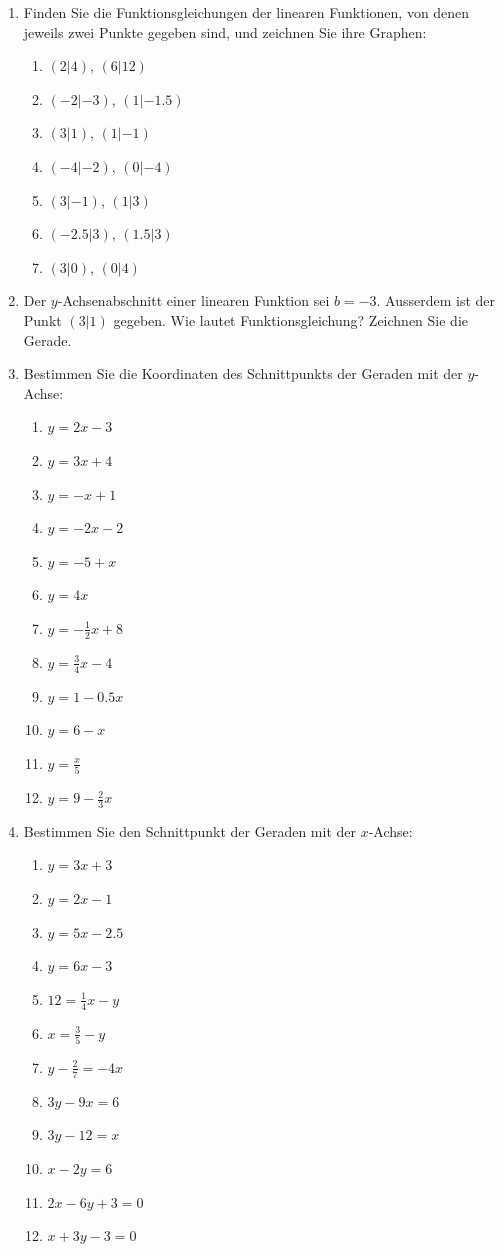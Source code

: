 \documentclass[%
11pt,%
twoside,%
titlepage,%
german,%
headsepline%
]{scrartcl}
\begin{document}
{{{\begin{enumerate}
\item Finden Sie die Funktionsgleichungen der linearen Funktionen, von denen jeweils zwei Punkte gegeben sind, und zeichnen Sie ihre Graphen:
  \begin{enumerate}
  \item $(2|4)$, $(6|12)$
  \item $(-2|-3)$, $(1|-1.5)$
  \item $(3|1)$, $(1|-1)$
  \item $(-4|-2)$, $(0|-4)$
  \item $(3|-1)$, $(1|3)$
  \item $(-2.5|3)$, $(1.5|3)$
  \item $(3|0)$, $(0|4)$
  \end{enumerate}

\item Der $y$-Achsenabschnitt einer linearen Funktion sei $b=-3$. Ausserdem ist der Punkt $(3|1)$ gegeben. Wie lautet Funktionsgleichung? Zeichnen Sie die Gerade.

\item Bestimmen Sie die Koordinaten des Schnittpunkts der Geraden mit der $y$-Achse:
  \begin{enumerate}
  \item $y=2x-3$
  \item $y=3x+4$
  \item $y=-x+1$
  \item $y=-2x-2$
  \item $y=-5+x$
  \item $y=4x$
  \item $y=-\frac{1}{2}x+8$
  \item $y=\frac{3}{4}x-4$
  \item $y=1-0.5x$
  \item $y=6-x$
  \item $y=\frac{x}{5}$
  \item $y=9-\frac{2}{3}x$
  \end{enumerate}

\item Bestimmen Sie den Schnittpunkt der Geraden mit der $x$-Achse:
  \begin{enumerate}
  \item $y=3x+3$
  \item $y=2x-1$
  \item $y=5x-2.5$
  \item $y=6x-3$
  \item $12=\frac{1}{4}x-y$
  \item $x=\frac{3}{5}-y$
  \item $y-\frac{2}{7}=-4x$
  \item $3y-9x=6$
  \item $3y-12=x$
  \item $x-2y=6$
  \item $2x-6y+3=0$
  \item $x+3y-3=0$
  \end{enumerate}


\end{enumerate}}}}
\end{document}
